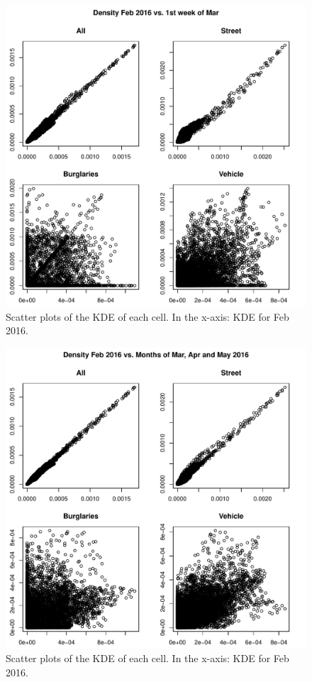 \documentclass[12pt,letterpaper]{article}
\theoremstyle{plain}
\theoremstyle{plain}
\theoremstyle{definition}
\theoremstyle{remark}
\begin{document}
\begin{figure}[h!]
    \centering
    \includegraphics[]{figures/scatter_kde_1w.pdf}
    \caption{Scatter plots of the KDE of each cell. In the x-axis: KDE for Feb 2016.}
    \label{fig:figure1}
\end{figure}

\begin{figure}[h!]
    \centering
    \includegraphics[]{figures/scatter_kde_3m.pdf}
    \caption{Scatter plots of the KDE of each cell. In the x-axis: KDE for Feb 2016.}
    \label{fig:figure1}
\end{figure}
\end{document}
